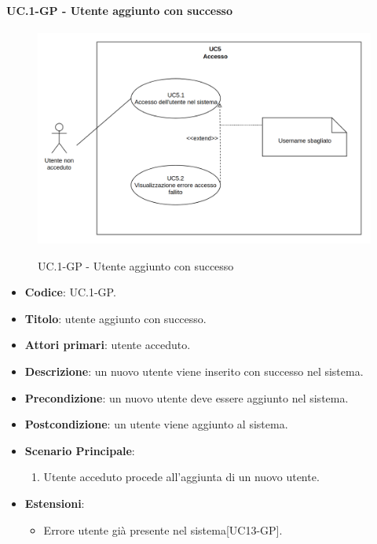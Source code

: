 	\paragraph{UC\theuccount.1-GP - Utente aggiunto con successo}
		\begin{figure}[H]
			\centering
			\includegraphics[width=\columnwidth]{img/UC5.png}\\
			\caption{UC\theuccount.1-GP - Utente aggiunto con successo}
		\end{figure}
		\begin{itemize}
			\item \textbf{Codice}: UC\theuccount.1-GP.
			\item \textbf{Titolo}: utente aggiunto con successo.
			\item \textbf{Attori primari}: utente acceduto.
			\item \textbf{Descrizione}: un nuovo utente viene inserito con successo nel sistema.
			\item \textbf{Precondizione}: un nuovo utente deve essere aggiunto nel sistema.
			\item \textbf{Postcondizione}: un utente viene aggiunto al sistema.
			\item \textbf{Scenario Principale}:
			\begin{enumerate}
				\item Utente acceduto procede all'aggiunta di un nuovo utente.
			\end{enumerate}
			\item \textbf{Estensioni}:
			\begin{itemize}
				\item Errore utente già presente nel sistema[UC13-GP].
			\end{itemize}
		\end{itemize}

